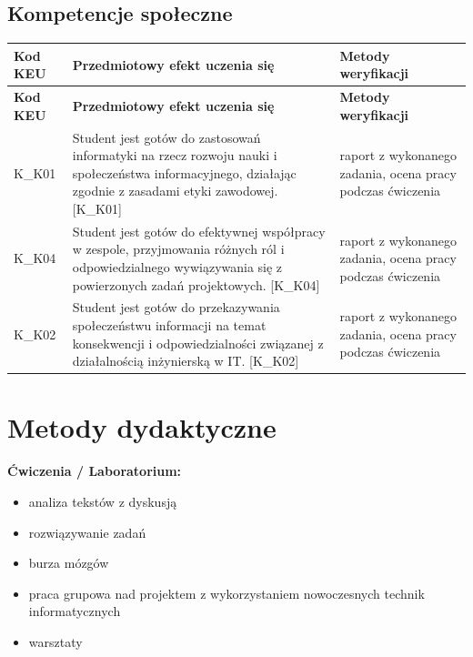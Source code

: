 \documentclass[12pt, a4paper]{article}
\newcommand{\thdrule}{\noalign{\global\setlength{\extrarowheight}{0pt}}}
\newcommand{\thdend}{\noalign{\global\setlength{\extrarowheight}{3pt}}}
\begin{document}
\subsection*{Kompetencje społeczne}
{\scriptsize
\begin{longtable}{m{1.6cm}m{9.0cm}m{4.2cm}}
\thdrule\toprule
\rowcolor{pjatkRed} {\color{white}\footnotesize\textbf{\vphantom{Ag}Kod KEU}} & {\color{white}\footnotesize\textbf{\vphantom{Ag}Przedmiotowy efekt uczenia się}} & {\color{white}\footnotesize\textbf{\vphantom{Ag}Metody weryfikacji}} \\
\midrule\thdend
\endfirsthead
\thdrule\toprule
\rowcolor{pjatkRed} {\color{white}\footnotesize\textbf{\vphantom{Ag}Kod KEU}} & {\color{white}\footnotesize\textbf{\vphantom{Ag}Przedmiotowy efekt uczenia się}} & {\color{white}\footnotesize\textbf{\vphantom{Ag}Metody weryfikacji}} \\
\midrule\thdend
\endhead
  \rowcolor{tableRowLight} K\_K01 & Student jest gotów do zastosowań informatyki na rzecz rozwoju nauki i społeczeństwa informacyjnego, działając zgodnie z zasadami etyki zawodowej. {[}K\_K01{]} & raport z wykonanego zadania, ocena pracy podczas ćwiczenia \\
  \rowcolor{tableRowAlt} K\_K04 & Student jest gotów do efektywnej współpracy w zespole, przyjmowania różnych ról i odpowiedzialnego wywiązywania się z powierzonych zadań projektowych. {[}K\_K04{]} & raport z wykonanego zadania, ocena pracy podczas ćwiczenia \\
  \rowcolor{tableRowLight} K\_K02 & Student jest gotów do przekazywania społeczeństwu informacji na temat konsekwencji i odpowiedzialności związanej z działalnością inżynierską w IT. {[}K\_K02{]} & raport z wykonanego zadania, ocena pracy podczas ćwiczenia \\
\bottomrule
\end{longtable}}

\section{Metody dydaktyczne}

\textbf{Ćwiczenia / Laboratorium:}
\begin{itemize}
  \item analiza tekstów z dyskusją
  \item rozwiązywanie zadań
  \item burza mózgów
  \item praca grupowa nad projektem z wykorzystaniem nowoczesnych technik informatycznych
  \item warsztaty
\end{itemize}
\vspace{4pt}
\end{document}
